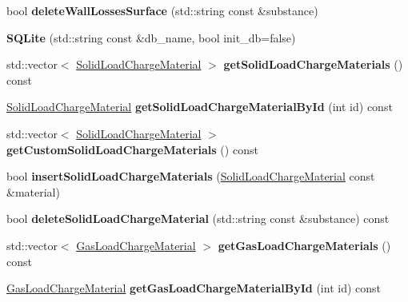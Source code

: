 \begin{DoxyCompactItemize}
\item 
\mbox{\label{class_s_q_lite_aa43f3d56f7caddaef26ad1eccef04118}} 
bool {\bfseries delete\+Wall\+Losses\+Surface} (std\+::string const \&substance)
\item 
\mbox{\label{class_s_q_lite_a758f334ed7e72820f4f0e83d2b707625}} 
{\bfseries S\+Q\+Lite} (std\+::string const \&db\+\_\+name, bool init\+\_\+db=false)
\item 
\mbox{\label{class_s_q_lite_af6195f55e9658c24a8f14b884e490acb}} 
std\+::vector$<$ \hyperlink{class_solid_load_charge_material}{Solid\+Load\+Charge\+Material} $>$ {\bfseries get\+Solid\+Load\+Charge\+Materials} () const
\item 
\mbox{\label{class_s_q_lite_ab2a00b913321a96a4d7b700627195616}} 
\hyperlink{class_solid_load_charge_material}{Solid\+Load\+Charge\+Material} {\bfseries get\+Solid\+Load\+Charge\+Material\+By\+Id} (int id) const
\item 
\mbox{\label{class_s_q_lite_a868c571d80d43a991762ec20c168ebb2}} 
std\+::vector$<$ \hyperlink{class_solid_load_charge_material}{Solid\+Load\+Charge\+Material} $>$ {\bfseries get\+Custom\+Solid\+Load\+Charge\+Materials} () const
\item 
\mbox{\label{class_s_q_lite_a5c40ac3b9a6abb85c9cfbe50802672c5}} 
bool {\bfseries insert\+Solid\+Load\+Charge\+Materials} (\hyperlink{class_solid_load_charge_material}{Solid\+Load\+Charge\+Material} const \&material)
\item 
\mbox{\label{class_s_q_lite_a87415ea66b330bc919acaaf042c8ff02}} 
bool {\bfseries delete\+Solid\+Load\+Charge\+Material} (std\+::string const \&substance) const
\item 
\mbox{\label{class_s_q_lite_accd7e97b19298b75eabc3a2b4bbc9b1c}} 
std\+::vector$<$ \hyperlink{class_gas_load_charge_material}{Gas\+Load\+Charge\+Material} $>$ {\bfseries get\+Gas\+Load\+Charge\+Materials} () const
\item 
\mbox{\label{class_s_q_lite_ab89ac4049cbedcb6340f5d7d0139b89e}} 
\hyperlink{class_gas_load_charge_material}{Gas\+Load\+Charge\+Material} {\bfseries get\+Gas\+Load\+Charge\+Material\+By\+Id} (int id) const

\end{DoxyCompactItemize}
